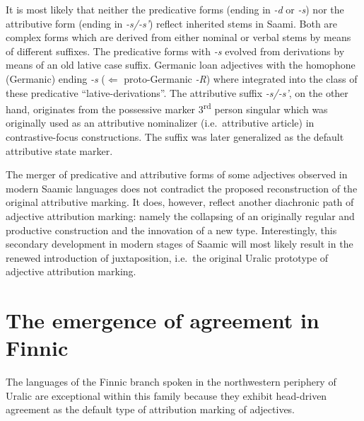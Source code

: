 {It is most likely that neither the predicative forms (ending in \textit{-d} or \textit{-s}) nor the attributive form (ending in \textit{-s/-s'}) reflect inherited stems in Saami. Both are complex forms which are derived from either nominal or verbal stems by means of different suffixes. The predicative forms with \textit{-s} evolved from derivations by means of an old lative case suffix. Germanic loan adjectives with the homophone (Germanic) ending \textit{-s} ($\Leftarrow$ proto-Germanic \textit{-R}) where integrated into the class of these predicative “lative-derivations”. The attributive suffix \textit{-s/-s'}, on the other hand, originates from the possessive marker 3\textsuperscript{rd} person singular which was originally used as an attributive nominalizer (i.e.~attributive article) in contrastive-focus constructions. The suffix was later generalized as the default attributive state marker.

The merger of predicative and attributive forms of some adjectives observed in modern Saamic languages does not contradict the proposed reconstruction of the original attributive marking. It does, however, reflect another diachronic path of adjective attribution marking: namely the collapsing of an originally regular and productive construction and the innovation of a new type. Interestingly, this secondary development in modern stages of Saamic will most likely result in the renewed introduction of juxtaposition, i.e.~the original Uralic prototype of adjective attribution marking.

\section[Agreement in Finnic]{The emergence of agreement in Finnic} \label{Finnic diachr}

The languages of the Finnic branch spoken in the northwestern periphery of Uralic are exceptional within this family because they exhibit head-driven agreement as the default type of attribution marking of adjectives.

}
